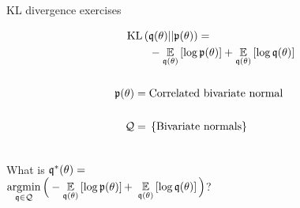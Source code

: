 \begin{frame}{KL divergence exercises}
\hspace{-3em}
\begin{minipage}{0.5\textwidth}
%
\begin{align*}
%
\MoveEqLeft
\kl{\q(\theta)}{\p(\theta)} ={}\\&
-\expect{\q(\theta)}{\log \p(\theta)} +
\expect{\q(\theta)}{\log \q(\theta)}\\ \\
\p(\theta) ={}& \textrm{Correlated bivariate normal}\\ \\
\qdom ={}& \left\{ \textrm{Bivariate normals}\right\}\\ \\
%
\end{align*}

What is $\mathfrak{q}^*(\theta) = $\\
$\underset{\mathfrak{q} \in \mathcal{Q}}{\mathrm{argmin}}\,
\Big(-\underset{\mathfrak{q}(\theta)}{\mathbb{E}}\left[\log \mathfrak{p}(\theta)\right] +$
\sout{$\underset{\mathfrak{q}(\theta)}{\mathbb{E}}\left[\log \mathfrak{q}(\theta)\right] \Big)$}?
%
\end{minipage}
%
\begin{minipage}{0.4\textwidth}

\end{minipage}


\end{frame}




